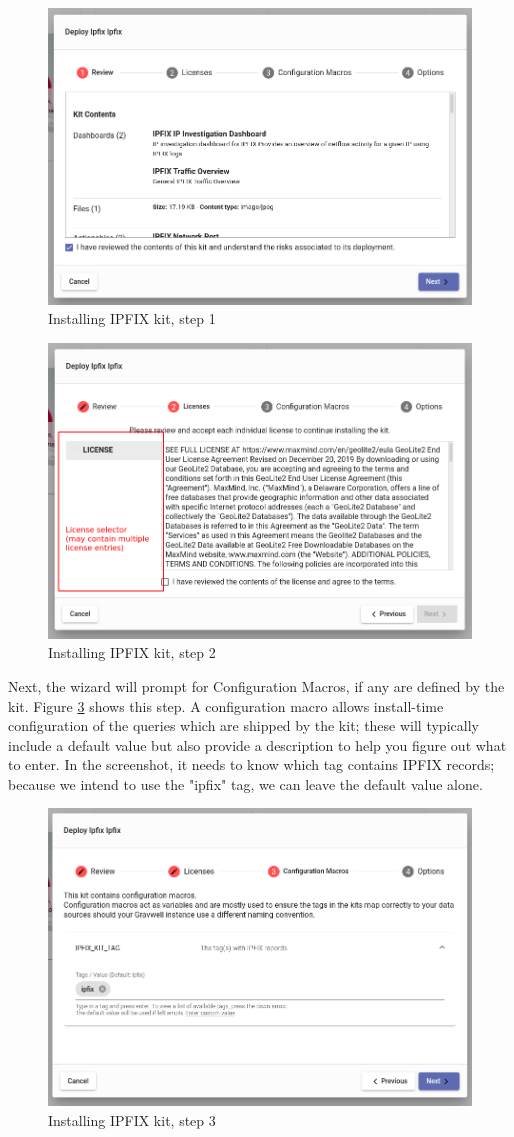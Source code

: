 \begin{figure}[H]
	\includegraphics[width=0.6\linewidth]{images/wizard1.png}
	\caption{Installing IPFIX kit, step 1}
	\label{fig:wizard1}
\end{figure}

\begin{figure}[H]
	\includegraphics[width=0.6\linewidth]{images/wizard2.png}
	\caption{Installing IPFIX kit, step 2}
	\label{fig:wizard2}
\end{figure}

Next, the wizard will prompt for Configuration Macros, if any are defined by the kit. Figure \ref{fig:wizard3} shows this step. A configuration macro allows install-time configuration of the queries which are shipped by the kit; these will typically include a default value but also provide a description to help you figure out what to enter. In the screenshot, it needs to know which tag contains IPFIX records; because we intend to use the "ipfix" tag, we can leave the default value alone.

\begin{figure}[H]
	\includegraphics[width=0.6\linewidth]{images/wizard3.png}
	\caption{Installing IPFIX kit, step 3}
	\label{fig:wizard3}
\end{figure}

